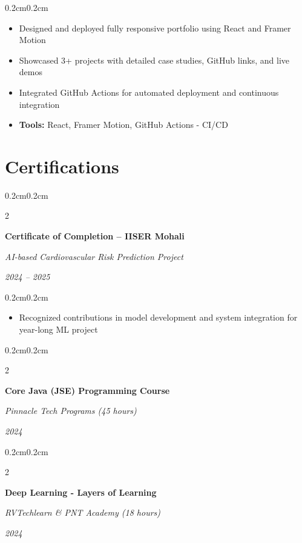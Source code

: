 \documentclass[10pt, letterpaper]{article}
\newenvironment{highlights}{
    \begin{itemize}[
        topsep=0.10cm,
        parsep=0.10cm,
        partopsep=0pt,
        itemsep=0pt,
        leftmargin=0.4cm + 10pt
    ]
}{\end{itemize}}
\newenvironment{onecolentry}{
    \begin{adjustwidth}{0.2cm}{0.2cm}
}{\end{adjustwidth}}
\newenvironment{twocolentry}[2][]{
    \onecolentry
    \def\secondColumn{#2}
    \setcolumnwidth{\fill, 4.5cm}
    \begin{paracol}{2}
}{
    \switchcolumn \raggedleft \secondColumn
    \end{paracol}
    \endonecolentry
}
\begin{document}
    \vspace{0.10 cm}
    \begin{onecolentry}
        \begin{highlights}
            \item Designed and deployed fully responsive portfolio using React and Framer Motion
            \item Showcased 3+ projects with detailed case studies, GitHub links, and live demos
            \item Integrated GitHub Actions for automated deployment and continuous integration
            \item \textbf{Tools:} React, Framer Motion, GitHub Actions - CI/CD
        \end{highlights}
    \end{onecolentry}

    \section{Certifications}
    
    \begin{twocolentry}{
        \textit{2024 -- 2025}
    }
        \textbf{Certificate of Completion -- IISER Mohali}
        
        \textit{AI-based Cardiovascular Risk Prediction Project}
    \end{twocolentry}
    
    \vspace{0.10 cm}
    \begin{onecolentry}
        \begin{highlights}
            \item Recognized contributions in model development and system integration for year-long ML project
        \end{highlights}
    \end{onecolentry}

    \vspace{0.2 cm}

    \begin{twocolentry}{
        \textit{2024}
    }
        \textbf{Core Java (JSE) Programming Course}
        
        \textit{Pinnacle Tech Programs (45 hours)}
    \end{twocolentry}

    \vspace{0.2 cm}

    \begin{twocolentry}{
        \textit{2024}
    }
        \textbf{Deep Learning - Layers of Learning}
        
        \textit{RVTechlearn \& PNT Academy (18 hours)}
    \end{twocolentry}
\end{document}

